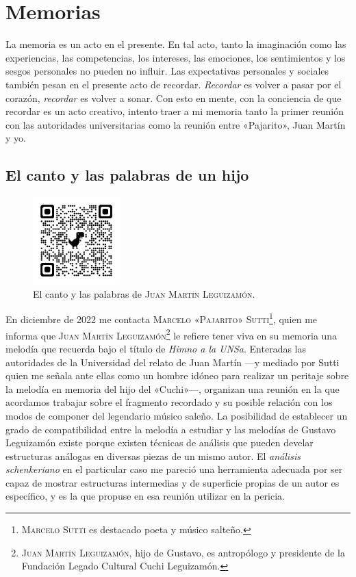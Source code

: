 \chapter{Memorias}
\label{cap:memorias}

La memoria es un acto en el presente. En tal acto, tanto la imaginación como las experiencias, las competencias, los intereses, las emociones, los sentimientos y los sesgos personales no pueden no influir. Las expectativas personales y sociales también pesan en el presente acto de recordar. \emph{Recordar} es volver a pasar por el corazón, \emph{recordar} es volver a sonar. Con esto en mente, con la conciencia de que recordar es un acto creativo, intento traer a mi memoria tanto la primer reunión con las autoridades universitarias como la reunión entre «Pajarito», Juan Martín y yo.


\section{El canto y las palabras de un hijo}
\label{sec:palabra-canto}

\begin{figure}[H]
\centering
\includegraphics[width=0.3\textwidth]{img/qrcode-himno-memoria}
\caption{El canto y las palabras de \textsc{Juan Martín Leguizamón}.}
\label{fig:canto-palabras}
\end{figure}


En diciembre de 2022 me contacta \textsc{Marcelo «Pajarito» Sutti}\footnote{\textsc{Marcelo Sutti} es destacado poeta y músico salteño.}, quien me informa que \textsc{Juan Martín Leguizamón}\footnote{\textsc{Juan Martín Leguizamón}, hijo de Gustavo, es antropólogo y presidente de la Fundación Legado Cultural Cuchi Leguizamón.} le refiere tener viva en su memoria una melodía que recuerda bajo el título de \emph{Himno a la UNSa}. Enteradas las autoridades de la Universidad del relato de Juan Martín ---y mediado por Sutti quien me señala ante ellas como un hombre idóneo para realizar un peritaje sobre la melodía en memoria del hijo del «Cuchi»---, organizan una reunión en la que acordamos trabajar sobre el fragmento recordado y su posible relación con los modos de componer del legendario músico saleño. La posibilidad de establecer un grado de compatibilidad entre la melodía a estudiar y las melodías de Gustavo Leguizamón existe porque existen técnicas de análisis que pueden develar estructuras análogas en diversas piezas de un mismo autor. El \emph{análisis schenkeriano} en el particular caso me pareció una herramienta adecuada por ser capaz de mostrar estructuras intermedias y de superficie propias de un autor es específico, y es la que propuse en esa reunión utilizar en la pericia.


